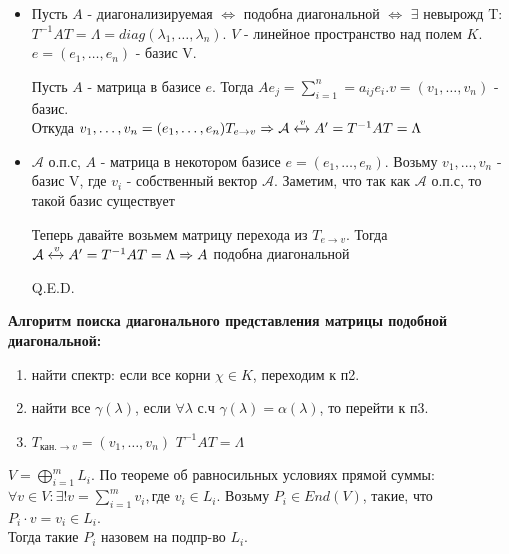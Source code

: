 \begin{itemize}
    \item  \fbox{\(\Rightarrow\)}
    
    Пусть $A$ - диагонализируемая $\Leftrightarrow$ подобна диагональной $\Leftrightarrow$ $\exists$ невырожд T: $T^{-1}AT=\Lambda=diag(\lambda_1,\ldots,\lambda_n)$. $V$ - линейное пространство над полем $K$. $e = (e_1,\ldots,e_n)$ - базис V.

    Пусть $A$ - матрица в базисе $e$. Тогда $Ae_j = \sum\limits_{i=1}^n=a_{ij}e_i$.$v =(v_1,\ldots,v_n)$ - базис.\\Откуда $v_1,\ldots,v_n = (e_1,\ldots,e_n)T_{e\rightarrow v} \Rightarrow \mathcal{A}\xleftrightarrow{v} A' = T^{-1}AT=\Lambda$ 
    \item \fbox{\(\Leftarrow\)}
    $\mathcal{A}$ о.п.с, $A$ - матрица в некотором базисе $e= (e_1,\ldots,e_n)$.
    Возьму $v_1, ..., v_n$ - базис V, где $v_i$ - собственный вектор $\mathcal{A}$. Заметим, что так как $\mathcal{A}$ о.п.с, то такой базис существует

   Теперь давайте возьмем матрицу перехода из $T_{e\rightarrow v}$. Тогда $\mathcal{A}\xleftrightarrow{v} A' = T^{-1}AT=\Lambda \Rightarrow A$ подобна диагональной   

    \hfill Q.E.D.
\end{itemize}
   
\textbf{Алгоритм поиска диагонального представления матрицы подобной диагональной:}
\begin{enumerate}
    \item найти спектр: если все корни $\chi \in K $, переходим к п2.
    \item найти все $\gamma(\lambda)$, если $\forall \lambda$ с.ч $\gamma(\lambda) = \alpha(\lambda)$, то перейти к п3.
    \item $T_{\text{кан.}\rightarrow v} = (v_1,\ldots,v_n)$ $T^{-1}AT = \Lambda$
\end{enumerate}







 $V = \bigoplus\limits_{i=1}^mL_i$. По теореме об равносильных условиях прямой суммы: 
\\$\forall v\in V: \exists! v = \sum\limits_{i=1}^mv_i, \text{где } v_i \in L_i$. Возьму $P_i \in  End(V)$,  такие, что $P_i \cdot v = v_i \in L_i$.\\ Тогда такие $P_i$ назовем  на подпр-во $L_i$.



